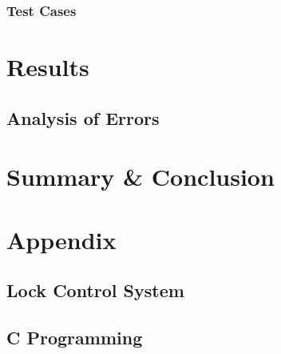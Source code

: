 \documentclass{article}
\begin{document}
		\subsubsection{Test Cases}


\section{Results}
	\subsection{Analysis of Errors}


\section{Summary \& Conclusion}


\section{Appendix}
	\subsection{Lock Control System}
	\subsection{C Programming}
\end{document}
